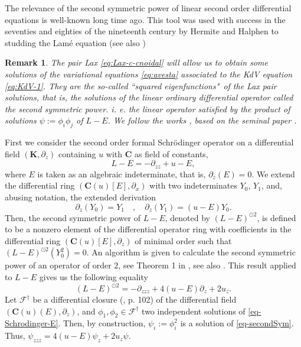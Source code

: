 \documentclass[a4paper,12pt]{article}
\newcommand{\K}{\mathbf{K}}
\newcommand{\coC}{\mathbf{C}}
\newtheorem{rem}[thm]{Remark}
\begin{document}
 
The relevance of the second symmetric power of linear second order differential equations is well-known  long time ago.  This tool  was used  with success in the seventies and eighties of the nineteenth century by Hermite  and Halphen to studding the Lam\'e equation \cite{HER,HALP} (see also \cite{WW, brezhnev2008does,smirnov2002elliptic})


\begin{rem}
The pair Lax \eqref{eq:Lax-c-cnoidal} will allow us to obtain  some solutions of the variational equations \eqref{eq:avesta} associated to the KdV equation \eqref{eq:KdV-1}.  They are the so-called ``squared eigenfunctions"\ of the Lax pair solutions, that is, the solutions of the linear ordinary differential operator called the second symmetric power. i. e. the linear operator satisfied by {the product of solutions $\psi:=\phi_i\phi_j$} of $L-E$. We follow the works \cite{mclaughlin1986construction,flaschka1980multiphase,mckean1975spectrum}, based on the seminal paper \cite{gardner1974korteweg}.    
\end{rem}




\bigskip

First we consider the second order formal Schr\"odinger operator on a differential field $(\K, \partial_z )$ containing $u$ with $\coC$ as field of constants,
\begin{equation}\label{eq-Schrodinger-E}
    L-E =  -\partial_{zz}+u -E ,
\end{equation}
where $E$ is taken as an algebraic indeterminate, that is, $\partial_z (E)=0$. We extend the differential ring $(\coC(u)[E], \partial_x )$  with two indeterminates $Y_0$, $Y_1$, and, abusing notation,  the extended derivation  
\begin{equation*}
    \partial_z (Y_0) = Y_1 \quad , \quad \partial_z (Y_1 )= (u-E)Y_0 .
\end{equation*}
Then, the second symmetric power of $L-E $, denoted by $ (L-E)^{\odot 2}$, is defined to be a nonzero element of the differential operator ring with coefficients in the differential ring $(\coC(u)[E], \partial_z )$ of minimal order such that $(L-E)^{\odot 2} (Y_0^2 ) =0 $. An algorithm is given to calculate the second symmetric power of an operator of order $2$, see Theorem 1 in \cite{bronstein1997symmetric}, see also \cite{singer1993galois} . This result applied to $L-E$ gives us the following equality
\begin{equation}\label{eq-secondSym}
(L-E)^{\odot 2}    =-\partial_{zzz} +4 (u-E)\partial_z +2u_z .
\end{equation}
Let $\mathcal{F}^\dag$  be  a differential closure (\cite{Kolchin1973}, p. 102) of the differential field $(\coC(u)(E), \partial_z )$, and $\phi_1 , \phi_2 \in \mathcal{F}^\dag$ two independent solutions of \eqref{eq-Schrodinger-E}. Then, by construction, $\psi_i := \phi_i^2$ is a solution of \eqref{eq-secondSym}. Thus, $\psi_{zzz}=4 (u-E)\psi_z +2u_z \psi  $. 
\end{document}
